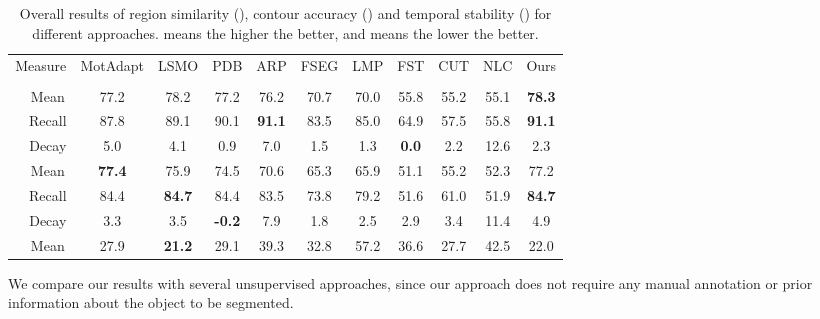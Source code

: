 \documentclass{bmvc2k}
\begin{document}
\begin{table}[!hbp]

\centering
\footnotesize
\begin{tabular}{c|c|cccccccccc}

\hline

\multicolumn{2}{c|}{\multirow{2}{*}{Measure}}    & MotAdapt  & LSMO  & PDB   & ARP  & FSEG   & LMP & FST    & CUT  & NLC & Ours \\
\multicolumn{2}{c|}{}           & \cite{siam2018video}  & \cite{tokmakov2019learning} & \cite{Song_2018_ECCV} & \cite{koh2017primary} & \cite{jain2017fusionseg}  & \cite{tokmakov2016learning}  & \cite{keuper2015motion}   & \cite{faktor2014video}  & \cite{fragkiadaki2012video} & \\ 
\hline
\multirow{3}{*}{}  
& Mean                & 77.2  & 78.2  & 77.2  & 76.2	& 70.7	
                                & 70.0	& 55.8	& 55.2	& 55.1  & \textbf{78.3}  \\
& Recall              & 87.8  & 89.1  & 90.1  & \textbf{91.1}	& 83.5	
                                & 85.0	& 64.9	& 57.5  & 55.8  & \textbf{91.1} \\
& Decay             & 5.0   & 4.1   & 0.9   & 7.0	& 1.5	
                                & 1.3	& \textbf{0.0}	& 2.2   & 12.6  & 2.3 \\
\hline
\multirow{3}{*}{}  
& Mean                & \textbf{77.4}  & 75.9  & 74.5  & 70.6	& 65.3	
                                & 65.9	& 51.1	& 55.2	& 52.3  & 77.2 \\
& Recall              & 84.4  & \textbf{84.7}  & 84.4  & 83.5  & 73.8	
                                & 79.2	& 51.6	& 61.0	& 51.9  & \textbf{84.7} \\
& Decay             & 3.3   & 3.5   & \textbf{-0.2}  & 7.9   & 1.8	
                                & 2.5	& 2.9	& 3.4	& 11.4  & 4.9 \\
\hline

& Mean              & 27.9  & \textbf{21.2}  & 29.1  & 39.3	& 32.8	
                                & 57.2	& 36.6	& 27.7	& 42.5  & 22.0\\
\hline
\end{tabular}
\caption{Overall results of region similarity (), contour accuracy () and temporal stability () for different approaches.  means the higher the better, and  means the lower the better.}
\label{tab:davis_overall}
\end{table}
We compare our results with several unsupervised approaches, since our approach does not require any manual annotation or prior information about the object to be segmented.
\end{document}
